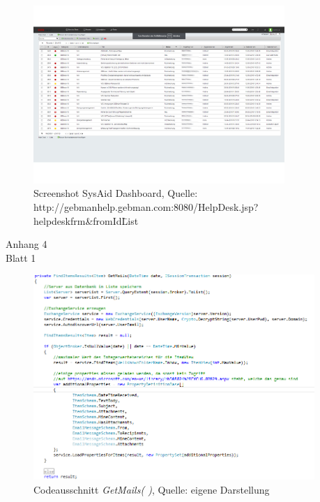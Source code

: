 \begin{figure}[h!]
\includegraphics[width=0.85\textwidth]{Abbildungen/SysAid.pdf}
\caption*{Screenshot SysAid Dashboard, \newline
Quelle: http://gebmanhelp.gebman.com:8080/HelpDesk.jsp?helpdeskfrm\&fromId\=List}
\label{SysAid}
\end{figure}

\newpage


\begin{flushright}
Anhang 4\\
Blatt 1\\
\label{Anhang4}
\end{flushright}


\begin{figure}[h!]
\includegraphics[width=0.95\textwidth]{Abbildungen/Codeausschnitt.png}
	\caption*{Codeausschnitt \textit{GetMails( )}, Quelle: eigene Darstellung}
	\label{Codeausschnitt}
\end{figure}







